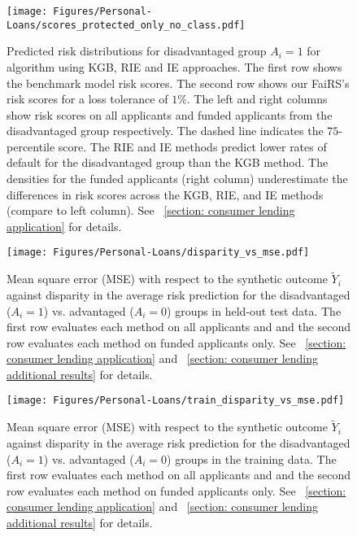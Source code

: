 \documentclass{article}
\begin{document}
\begin{figure}[htbp!]
    \centering
    \texttt{[image: Figures/Personal-Loans/scores\_protected\_only\_no\_class.pdf]}
    \caption{Predicted risk distributions for disadvantaged group $A_i = 1$ for \fairs algorithm using KGB, RIE and IE approaches. The first row shows the benchmark model risk scores. The second row shows our FaiRS's risk scores for a loss tolerance of $1\%$. The left and right columns show risk scores on all applicants and funded applicants from the disadvantaged group respectively. The dashed line indicates the $75$-percentile score. The RIE and IE methods predict lower rates of default for the disadvantaged group than the KGB method. The densities for the funded applicants (right column) underestimate the differences in risk scores across the KGB, RIE, and IE methods (compare to left column). See \textsection~\ref{section: consumer lending application} for details.}
    \label{fig:sel_scores}
\end{figure}

\begin{figure}[htbp!]
    \centering
    \texttt{[image: Figures/Personal-Loans/disparity\_vs\_mse.pdf]}
    \caption{Mean square error (MSE) with respect to the synthetic outcome $\tilde Y_i$ against disparity in the average risk prediction for the disadvantaged ($A_i = 1$) vs. advantaged ($A_i = 0$) groups in held-out test data. The first row evaluates each method on all applicants and and the second row evaluates each method on funded  applicants only. See \textsection~\ref{section: consumer lending application} and \textsection~\ref{section: consumer lending additional results} for details.
    }
    \label{fig:lending application disparity vs mse on test}
\end{figure}

\begin{figure}[htbp!]
    \centering
    \texttt{[image: Figures/Personal-Loans/train\_disparity\_vs\_mse.pdf]}
    \caption{Mean square error (MSE) with respect to the synthetic outcome $\tilde Y_i$ against disparity in the average risk prediction for the disadvantaged ($A_i = 1$) vs. advantaged ($A_i = 0$) groups in the training data. The first row evaluates each method on all applicants and and the second row evaluates each method on funded  applicants only. See \textsection~\ref{section: consumer lending application} and \textsection~\ref{section: consumer lending additional results} for details.
    }
    \label{fig:lending application disparity vs mse on train}
\end{figure}
\end{document}
